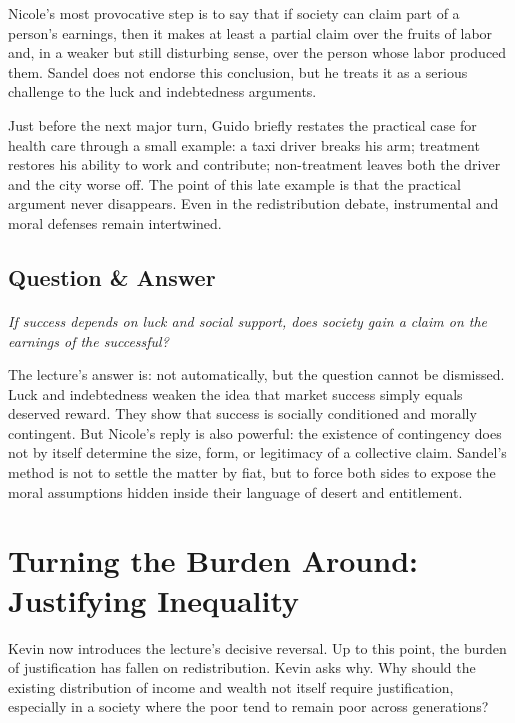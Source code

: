 Nicole's most provocative step is to say that if society can claim part of a person's earnings, then it makes at least a partial claim over the fruits of labor and, in a weaker but still disturbing sense, over the person whose labor produced them. Sandel does not endorse this conclusion, but he treats it as a serious challenge to the luck and indebtedness arguments.

Just before the next major turn, Guido briefly restates the practical case for health care through a small example: a taxi driver breaks his arm; treatment restores his ability to work and contribute; non-treatment leaves both the driver and the city worse off. The point of this late example is that the practical argument never disappears. Even in the redistribution debate, instrumental and moral defenses remain intertwined.

\subsection{Question \& Answer}

\paragraph{}
\emph{If success depends on luck and social support, does society gain a claim on the earnings of the successful?}

The lecture's answer is: not automatically, but the question cannot be dismissed. Luck and indebtedness weaken the idea that market success simply equals deserved reward. They show that success is socially conditioned and morally contingent. But Nicole's reply is also powerful: the existence of contingency does not by itself determine the size, form, or legitimacy of a collective claim. Sandel's method is not to settle the matter by fiat, but to force both sides to expose the moral assumptions hidden inside their language of desert and entitlement.

\section{Turning the Burden Around: Justifying Inequality}

Kevin now introduces the lecture's decisive reversal. Up to this point, the burden of justification has fallen on redistribution. Kevin asks why. Why should the existing distribution of income and wealth not itself require justification, especially in a society where the poor tend to remain poor across generations?

